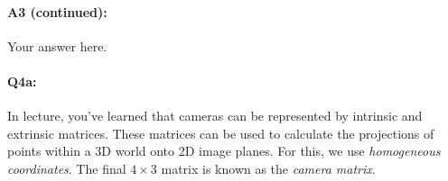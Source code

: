 \pagebreak
\paragraph{A3 (continued):} Your answer here.




\pagebreak
\paragraph{Q4a:} In lecture, you've learned that cameras can be represented by intrinsic and extrinsic matrices. These matrices can be used to calculate the projections of points within a 3D world onto 2D image planes. For this, we use \emph{homogeneous coordinates}. The final $4\times3$ matrix is known as the \emph{camera matrix}.
